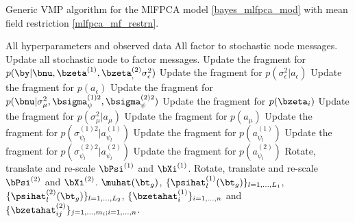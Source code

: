 \documentclass[12pt]{article}
\theoremstyle{plain}
\theoremstyle{definition}
\theoremstyle{remark}
\def\sigsqeps{\sigma^2_{\epsilon}}
\def\aeps{a_{\epsilon}}
\def\sigsqmu{\sigma^2_{\mu}}
\def\amu{a_{\mu}}
\newcommand\bzetaL[2]{\bzeta^{(#1)}_{#2}}
\newcommand\sigsqpsiL[2]{\sigma^{(#1) 2}_{\psi_{#2}}}
\newcommand\apsiL[2]{a^{(#1)}_{\psi_{#2}}}
\newcommand\bPsiL[1]{\bPsi^{(#1)}}
\newcommand\bXiL[1]{\bXi^{(#1)}}
\begin{document}
\begin{algorithm}
	\caption{
		Generic VMP algorithm for the MlFPCA model \eqref{bayes_mlfpca_mod} with
		mean field restriction \eqref{mlfpca_mf_restrn}.
	}
	\label{alg:vmp_ml_alg}
	\begin{algorithmic}[1]
		\Inputs All hyperparameters and observed data
		\Initialize All factor to stochastic node messages.
		\Updates
				\State Update all stochastic node to factor messages.
				\State Update the fragment for $p (\by | \bnu, \bzetaL{1}{}, \bzetaL{2}, \sigsqeps)$
				\State Update the fragment for $p (\sigsqeps | \aeps)$
				\State Update the fragment for $p (\aeps)$
				\State Update the fragment for $p ( \bnu | \sigsqmu, \bsigma^{(1) 2}_\psi, \bsigma^{(2) 2}_\psi )$
					\State Update the fragment for $p (\bzeta_i)$
						\Comment{\eqref{np_ml_gauss_prior}}
				\EndFor
				\State Update the fragment for $p (\sigsqmu | \amu)$
				\State Update the fragment for $p (\amu)$
					\State Update the fragment for $p (\sigsqpsiL{1}{l} | \apsiL{1}{l})$
					\State Update the fragment for $p (\apsiL{1}{l})$
				\EndFor
					\State Update the fragment for $p (\sigsqpsiL{2}{l} | \apsiL{2}{l})$
					\State Update the fragment for $p (\apsiL{2}{l})$
				\EndFor
			\EndWhile
			\State Rotate, translate and re-scale $\bPsiL{1}$ and $\bXiL{1}$.
			\State Rotate, translate and re-scale $\bPsiL{2}$ and $\bXiL{2}$.
		\Outputs $\muhat (\bt_g)$, $\{ \psihat^{(1)}_l (\bt_g) \}_{l = 1, \dots, L_1}$,
			$\{ \psihat^{(2)}_l (\bt_g) \}_{l = 1, \dots, L_2}$, $\{ \bzetahat^{(1)}_i \}_{i = 1, \dots, n}$
			and $\{ \bzetahat^{(2)}_{ij} \}_{j = 1, \dots, m_i; i = 1, \dots, n}$.
	\end{algorithmic}
\end{algorithm}




\end{document}

